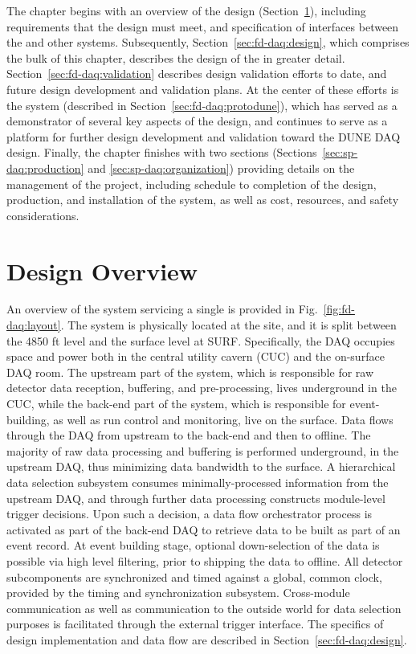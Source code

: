 The chapter begins with an overview of the  design (Section~\ref{sec:fd-daq:overview}),
including requirements that the design must meet, and specification of
interfaces between the   and other   systems. 
Subsequently, Section~\ref{sec:fd-daq:design}, which comprises the
bulk of this chapter, describes the design of the 
 in greater detail.
Section~\ref{sec:fd-daq:validation} describes design validation efforts
to date, and future design development and validation plans. At the
center of these efforts is the 
  system (described in Section~\ref{sec:fd-daq:protodune}), which has served as a demonstrator of several
key aspects of the      design, and continues to serve as a
platform for further design development and validation toward the
DUNE DAQ design. 
Finally, the chapter finishes with two sections
(Sections~\ref{sec:sp-daq:production} and \ref{sec:sp-daq:organization}) providing details on
the management of the
 project, including schedule to completion of the design, 
production, and installation of the system, as well as cost, resources, and
safety considerations.

\section{Design Overview}
\label{sec:fd-daq:overview}

An overview of the    system 
servicing a single 
 is
provided in Fig.~\ref{fig:fd-daq:layout}. The system is
physically located at the  site, and it is split between the
4850 ft level and the surface level at SURF. Specifically, the DAQ occupies space and
power both in the central utility cavern (CUC) and the on-surface DAQ
room.  The upstream part of the system, which is responsible for
raw detector data reception, buffering, and pre-processing, lives
underground in the CUC, while the back-end part of the system, which is responsible for
event-building, as well as run control and monitoring, live on the
surface. Data flows through the DAQ from 
upstream to the back-end and then to offline. The majority
of raw data processing and buffering is performed underground, in the
upstream DAQ, thus minimizing data bandwidth to the surface. A
hierarchical data selection subsystem consumes minimally-processed
information from the upstream DAQ, and through further data processing
constructs module-level trigger decisions. Upon such a decision, a data
flow orchestrator process is activated as part of the back-end DAQ
to retrieve data to be built as part of an event record. At event
building stage, optional down-selection of the data is possible via
high level filtering, prior to shipping the data to offline.  All
detector subcomponents are synchronized and timed against a global,
common clock, provided by the timing and synchronization
subsystem. Cross-module communication as well as communication
to the outside world for data selection purposes is facilitated
through the external trigger interface. The
specifics of design implementation and data flow are described in Section~\ref{sec:fd-daq:design}.

